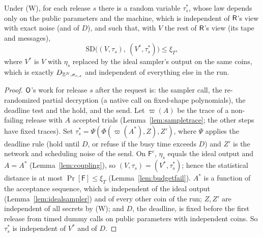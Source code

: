 \begin{lemma}\label{lem:releasetiming}
Under (W), for each release $s$ there is a random variable $\tau^*_s$, whose law depends only on the public parameters and the machine, which is independent of $\mathsf{R}$'s view with exact noise (and of $D$), and such that, with $V$ the rest of $\mathsf{R}$'s view (its tape and messages),
\[
  \mathrm{SD}\bigl((V,\tau_s),\ (V^*,\tau^*_s)\bigr)\le\xi_T ,
\]
where $V^*$ is $V$ with $\eta_s$ replaced by the ideal sampler's output on the same coins, which is exactly $D_{\mathbb{Z}^N,\sigma_{c,s}}$ and independent of everything else in the run.
\end{lemma}
\begin{proof}
$\mathsf{O}$'s work for release $s$ after the request is: the sampler call, the re-randomized partial decryption (a native call on fixed-shape polynomials), the deadline test and the hold, and the send. Let $\varpi(A)$ be the trace of a non-failing release with $A$ accepted trials (Lemma~\ref{lem:sampletrace}; the other steps have fixed traces). Set $\tau^*_s=\Psi(\Phi(\varpi(A^*),Z),Z')$, where $\Psi$ applies the deadline rule (hold until $D$, or refuse if the busy time exceeds $D$) and $Z'$ is the network and scheduling noise of the send. On $\mathsf F^c$, $\eta_s$ equals the ideal output and $A=A^*$ (Lemma~\ref{lem:coupling}), so $(V,\tau_s)=(V^*,\tau^*_s)$; hence the statistical distance is at most $\Pr[\mathsf F]\le\xi_T$ (Lemma~\ref{lem:budgetfail}). $A^*$ is a function of the acceptance sequence, which is independent of the ideal output (Lemma~\ref{lem:idealsampler}) and of every other coin of the run; $Z,Z'$ are independent of all secrets by (W); and $D$, the deadline, is fixed before the first release from timed dummy calls on public parameters with independent coins. So $\tau^*_s$ is independent of $V^*$ and of $D$.
\end{proof}

